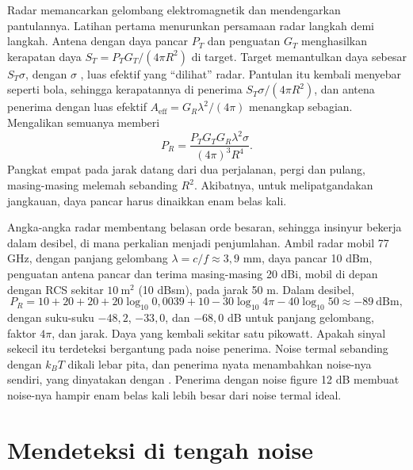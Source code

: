 Radar memancarkan gelombang elektromagnetik dan mendengarkan pantulannya. Latihan pertama menurunkan
persamaan radar langkah demi langkah. Antena dengan daya pancar $P_T$ dan penguatan $G_T$ menghasilkan
kerapatan daya $S_T=P_TG_T/(4\pi R^2)$ di target. Target memantulkan daya sebesar $S_T\sigma$, dengan
$\sigma$ , luas efektif yang ``dilihat'' radar. Pantulan itu kembali menyebar
seperti bola, sehingga kerapatannya di penerima $S_T\sigma/(4\pi R^2)$, dan antena penerima dengan luas
efektif $A_{\mathrm{eff}}=G_R\lambda^2/(4\pi)$ menangkap sebagian. Mengalikan semuanya memberi
\begin{equation}
P_R=\frac{P_TG_TG_R\lambda^2\sigma}{(4\pi)^3R^4}.
\end{equation}
Pangkat empat pada jarak datang dari dua perjalanan, pergi dan pulang, masing-masing melemah sebanding
$R^2$. Akibatnya, untuk melipatgandakan jangkauan, daya pancar harus dinaikkan enam belas kali.

Angka-angka radar membentang belasan orde besaran, sehingga insinyur bekerja dalam desibel, di mana
perkalian menjadi penjumlahan. Ambil radar mobil 77 GHz, dengan panjang gelombang $\lambda=c/f\approx3{,}9$ mm,
daya pancar 10 dBm, penguatan antena pancar dan terima masing-masing 20 dBi, mobil di depan dengan RCS
sekitar $10\ \mathrm{m^2}$ (10 dBsm), pada jarak 50 m. Dalam desibel,
\begin{equation}
P_R=10+20+20+20\log_{10}0{,}0039+10-30\log_{10}4\pi-40\log_{10}50\approx-89\ \mathrm{dBm},
\end{equation}
dengan suku-suku $-48{,}2$, $-33{,}0$, dan $-68{,}0$ dB untuk panjang gelombang, faktor $4\pi$, dan
jarak. Daya yang kembali sekitar satu pikowatt. Apakah sinyal sekecil itu terdeteksi bergantung pada
noise penerima. Noise termal sebanding dengan $k_BT$ dikali lebar pita, dan penerima nyata menambahkan
noise-nya sendiri, yang dinyatakan dengan . Penerima dengan noise figure 12 dB
membuat noise-nya hampir enam belas kali lebih besar dari noise termal ideal.

\section{Mendeteksi di tengah noise}

